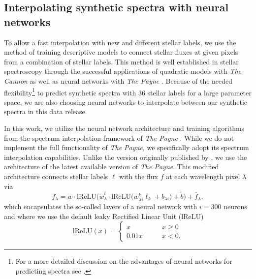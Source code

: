 \documentclass[
  journal=pasa,
  manuscript=research-paper, %
  year=2024,
  volume=37
]{cup-journal}
\begin{document}
\subsection{Interpolating synthetic spectra with neural networks} \label{sec:interpolating_synthetic_spectra_with_neural_networks}

To allow a fast interpolation with new and different stellar labels, we use the method of training descriptive models to connect stellar fluxes at given pixels from a combination of stellar labels. This method is well established in stellar spectroscopy through the successful applications of quadratic models with \textit{The Cannon} \citep[see e.g.][]{Ness2015, Ness2016, Casey2016, Casey2017, Ho2017, Buder2018} as well as neural networks with \textit{The Payne} \citep[see e.g.][]{Ting2019, Xiang2019, Xiang2021}. Because of the needed flexibility\footnote{For a more detailed discussion on the advantages of neural networks for predicting spectra see \citet{Ting2019}.} to predict synthetic spectra with 36 stellar labels for a large parameter space, we are also choosing neural networks to interpolate between our synthetic spectra in this data release.

In this work, we utilize the neural network architecture and training algorithms from the spectrum interpolation framework of \textit{The Payne} \citep{Ting2019}. While we do not implement the full functionality of \textit{The Payne}, we specifically adopt its spectrum interpolation capabilities. Unlike the version originally published by \citet{Ting2019}, we use the architecture of the latest available version of \textit{The Payne}. This modified architecture connects stellar labels $\boldsymbol{\ell}$ with the flux $f$ at each wavelength pixel $\lambda$ via
\begin{equation}
f_\lambda = w \cdot \mathrm{lReLU} \bigg( \tilde{w}_\lambda^i \cdot \mathrm{lReLU}  \Big( w^k_{\lambda i} \ell_k + b_{\lambda i} \Big) + \tilde{b} \bigg) + \bar{f}_\lambda,
\label{eq:neural_network_function}
\end{equation}
which encapsulates the so-called layers of a neural network with $i = 300$ neurons and where we use the default leaky Rectified Linear Unit ($\mathrm{lReLU}$)
\begin{equation}
    \mathrm{lReLU} (x) =  \begin{cases}
        x \qquad &x \geq 0 \\
        0.01 x \qquad &x < 0.
    \end{cases}
\end{equation}
\end{document}
